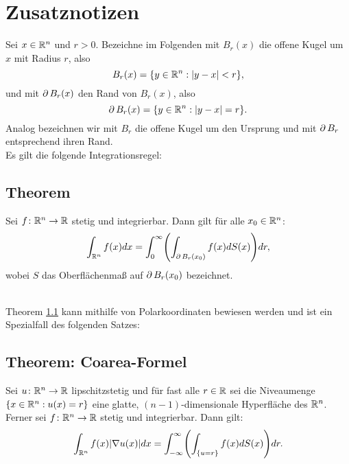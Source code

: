 \section{Zusatznotizen}
\label{sec:SuppNotes}
	Sei $x \in \mathbb{R}^n$ und $r > 0$. Bezeichne im Folgenden mit $B_r(x)$ die offene Kugel um $x$ mit Radius $r$, also
	\begin{equation}
		B_r(x) = \{ y \in \mathbb{R}^n : |y-x| < r \}, \label{supp_0.1}
	\end{equation}
	und mit $\operatorname{\partial} B_r(x)$ den Rand von $B_r(x)$, also
	\begin{equation}
		\operatorname{\partial} B_r(x) = \{ y \in \mathbb{R}^n : |y-x| = r \}. \label{supp_0.2}
	\end{equation}
	Analog bezeichnen wir mit $B_r$ die offene Kugel um den Ursprung und mit $\operatorname{\partial} B_r$ entsprechend ihren Rand. \\

	Es gilt die folgende Integrationsregel:
	
\subsection{Theorem}
\label{supp_1.1}
	Sei $f \colon \mathbb{R}^n \rightarrow \mathbb{R}$ stetig und integrierbar. Dann gilt für alle $x_0 \in \mathbb{R}^n$:
	\begin{equation}
		\int_{\RR^n} f(x) dx = \int_{0}^{\infty} \enbrace*{ \int_{\der B_r(x_0)}  f(x) dS(x) } dr, \label{supp_0.3}
	\end{equation}
	wobei $S$ das Oberflächenmaß auf $\operatorname{\partial} B_r(x_0)$ bezeichnet.
	
\mbox{} \\
Theorem \ref{supp_1.1} kann mithilfe von Polarkoordinaten bewiesen werden und ist ein Spezialfall des folgenden Satzes:

\subsection{Theorem: Coarea-Formel}
\label{supp_1.2}
	Sei $u \colon \mathbb{R}^n \rightarrow \mathbb{R}$ lipschitzstetig und für fast alle $r \in \mathbb{R}$ sei die Niveaumenge $\{x \in \mathbb{R}^n : u(x) = r\}$ eine glatte, $(n-1)$-dimensionale Hyperfläche des $\mathbb{R}^n$. Ferner sei $f \colon \mathbb{R}^n \rightarrow \mathbb{R}$ stetig und integrierbar. Dann gilt: 
	\begin{equation}
		\int_{\RR^n} f(x) |\nabla u(x)| dx = \int_{-\infty}^{\infty} \enbrace*{ \int_{ \{u = r\}} f(x) dS(x) } dr. \label{supp_0.4}
	\end{equation}


